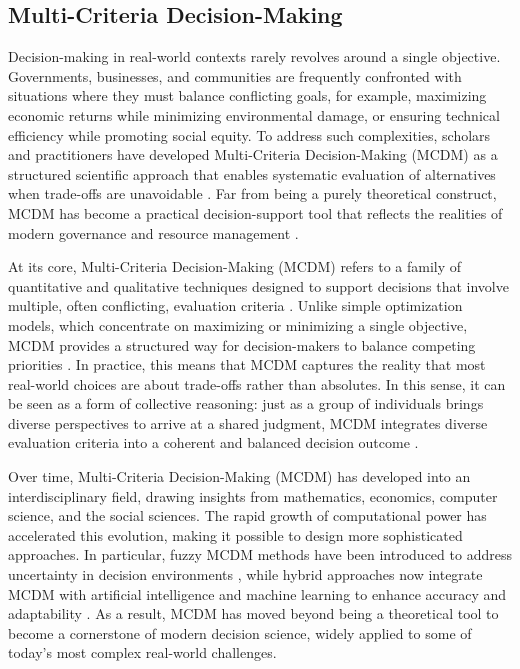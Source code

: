 \subsection{Multi-Criteria Decision-Making}
Decision-making in real-world contexts rarely revolves around a single objective. Governments, businesses, and communities are frequently confronted with situations where they must balance conflicting goals, for example, maximizing economic returns while minimizing environmental damage, or ensuring technical efficiency while promoting social equity. To address such complexities, scholars and practitioners have developed Multi-Criteria Decision-Making (MCDM) as a structured scientific approach that enables systematic evaluation of alternatives when trade-offs are unavoidable \cite{Aruldoss2013,Taherdoost2023}. Far from being a purely theoretical construct, MCDM has become a practical decision-support tool that reflects the realities of modern governance and resource management \cite{HUANG2011}.

At its core, Multi-Criteria Decision-Making (MCDM) refers to a family of quantitative and qualitative techniques designed to support decisions that involve multiple, often conflicting, evaluation criteria \cite{Aruldoss2013,Taherdoost2023}. Unlike simple optimization models, which concentrate on maximizing or minimizing a single objective, MCDM provides a structured way for decision-makers to balance competing priorities \cite{jones2010}. In practice, this means that MCDM captures the reality that most real-world choices are about trade-offs rather than absolutes. In this sense, it can be seen as a form of collective reasoning: just as a group of individuals brings diverse perspectives to arrive at a shared judgment, MCDM integrates diverse evaluation criteria into a coherent and balanced decision outcome \cite{Borges2020,Cinalli2015}.

Over time, Multi-Criteria Decision-Making (MCDM) has developed into an interdisciplinary field, drawing insights from mathematics, economics, computer science, and the social sciences. The rapid growth of computational power has accelerated this evolution, making it possible to design more sophisticated approaches. In particular, fuzzy MCDM methods have been introduced to address uncertainty in decision environments \cite{LIANG1999,Mardani2015}, while hybrid approaches now integrate MCDM with artificial intelligence and machine learning to enhance accuracy and adaptability \cite{Arabameri2020,PHAM2021}. As a result, MCDM has moved beyond being a theoretical tool to become a cornerstone of modern decision science, widely applied to some of today's most complex real-world challenges.

